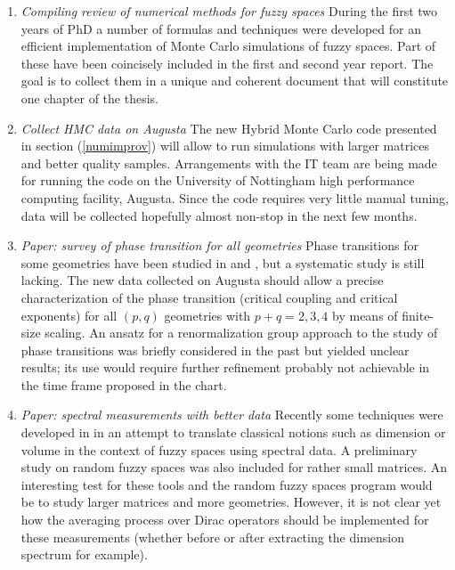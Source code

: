 \begin{enumerate}
\item \textit{Compiling review of numerical methods for fuzzy spaces}\newline
During the first two years of PhD a number of formulas and techniques were developed for an efficient implementation of Monte Carlo simulations of fuzzy spaces. Part of these have been coincisely included in the first and second year report. The goal is to collect them in a unique and coherent document that will constitute one chapter of the thesis.
\item \textit{Collect HMC data on Augusta}\newline
The new Hybrid Monte Carlo code presented in section (\ref{numimprov}) will allow to run simulations with larger matrices and better quality samples. Arrangements with the IT team are being made for running the code on the University of Nottingham high performance computing facility, Augusta. Since the code requires very little manual tuning, data will be collected hopefully almost non-stop in the next few months. 
\item \textit{Paper: survey of phase transition for all geometries}\newline
Phase transitions for some geometries have been studied in \cite{barrettglaser} and \cite{glaser}, but a systematic study is still lacking. The new data collected on Augusta should allow a precise characterization of the phase transition (critical coupling and critical exponents) for all $(p,q)$ geometries with $p+q = 2,3,4$ by means of finite-size scaling. An ansatz for a renormalization group approach to the study of phase transitions was briefly considered in the past but yielded unclear results; its use would require further refinement probably not achievable in the time frame proposed in the chart.
\item \textit{Paper: spectral measurements with better data}\newline
Recently some techniques were developed in \cite{barrdruceglaser} in an attempt to translate classical notions such as dimension or volume in the context of fuzzy spaces using spectral data. A preliminary study on random fuzzy spaces was also included for rather small matrices. An interesting test for these tools and the random fuzzy spaces program would be to study larger matrices and more geometries. However, it is not clear yet how the averaging process over Dirac operators should be implemented for these measurements (whether before or after extracting the dimension spectrum for example). 

\end{enumerate}
